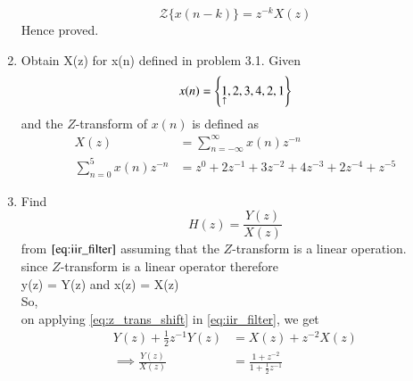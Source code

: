 \documentclass[journal,12pt,twocolumn]{IEEEtran}
\renewcommand\thesection{\arabic{section}}
\begin{document}
\begin{enumerate}[label=\thesection.\arabic*]
           \begin{equation}
                \label{eq:z_trans_shift}
                {\mathcal {Z}}\{x(n-k)\} = z^{-k}X(z)
           \end{equation}
           Hence proved.
     \item Obtain X(z) for x(n) defined in problem 3.1.
           \solution Given
           \begin{equation}
                x(n) = \left\{\underset{\uparrow}{1},2,3,4,2,1\right\}
           \end{equation}
           and the $Z$-transform of $x(n)$ is defined as
           \begin{align}
                X(z)                       & = \sum _{n=-\infty }^{\infty }x(n)z^{-n}                 \\
                \sum _{n=0 }^{5}x(n)z^{-n} & = z^{0} + 2z^{-1} + 3z^{-2} + 4z^{-3} + 2z^{-4} + z^{-5}
           \end{align}

     \item Find
           \begin{equation}
                \label{eq:dtft_1}
                H(z) = \frac{Y(z)}{X(z)}
           \end{equation}
           from  $\eqref{eq:iir_filter}$ assuming that the $Z$-transform is a linear operation.
           \\
           \solution since $Z$-transform is a linear operator therefore \\
           y(z) = Y(z) and x(z) = X(z) \\
           So, \\
           on applying \eqref{eq:z_trans_shift} in \eqref{eq:iir_filter},
           we get
           \begin{align}
                Y(z) + \frac{1}{2}z^{-1}Y(z) & = X(z)+z^{-2}X(z)
                \\
                \implies \frac{Y(z)}{X(z)}   & = \frac{1 + z^{-2}}{1 + \frac{1}{2}z^{-1}}
                \label{eq:freq_resp}
           \end{align}


\end{enumerate}
\end{document}
